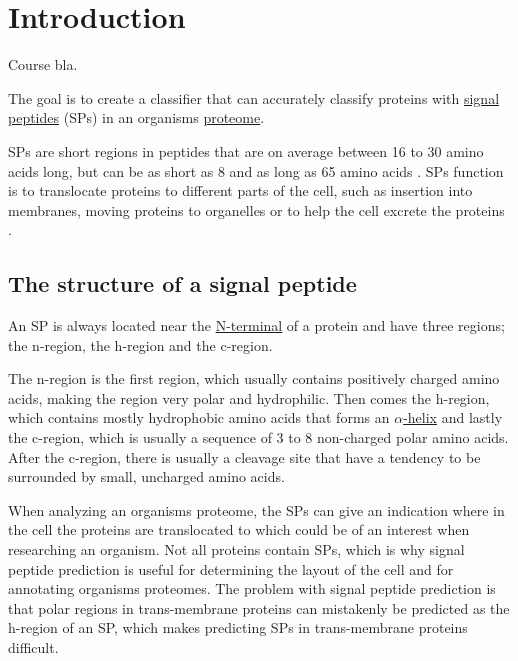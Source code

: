 
\section{Introduction}

Course bla. 

The goal is to create a classifier that can accurately classify proteins with \href{https://en.wikipedia.org/wiki/Signal_peptide}{signal peptides} (SPs) in an organisms \href{https://en.wikipedia.org/wiki/Proteome}{proteome}. 

SPs are short regions in peptides that are on average between 16 to 30 amino acids long, but can be as short as 8 and as long as 65 amino acids \cite{sp_length}. SPs function is to translocate proteins to different parts of the cell, such as insertion into membranes, moving proteins to organelles or to help the cell excrete the proteins \cite{sp_wiki}. 

\subsection{The structure of a signal peptide}

An SP is always located near the \href{https://en.wikipedia.org/wiki/N-terminus}{N-terminal} of a protein and have three regions; the n-region, the h-region and the c-region.

The n-region is the first region, which usually contains positively charged amino acids, making the region very polar and hydrophilic. Then comes the h-region, which contains mostly hydrophobic amino acids that forms an \href{https://en.wikipedia.org/wiki/Alpha_helix}{$\alpha$-helix} and lastly the c-region, which is usually a sequence of 3 to 8 non-charged polar amino acids. After the c-region, there is usually a cleavage site that have a tendency to be surrounded by small, uncharged amino acids.

When analyzing an organisms proteome, the SPs can give an indication where in the cell the proteins are translocated to which could be of an interest when researching an organism. Not all proteins contain SPs, which is why signal peptide prediction is useful for determining the layout of the cell and for annotating organisms proteomes. The problem with signal peptide prediction is that polar regions in trans-membrane proteins can mistakenly be predicted as the h-region of an SP, which makes predicting SPs in trans-membrane proteins difficult.


